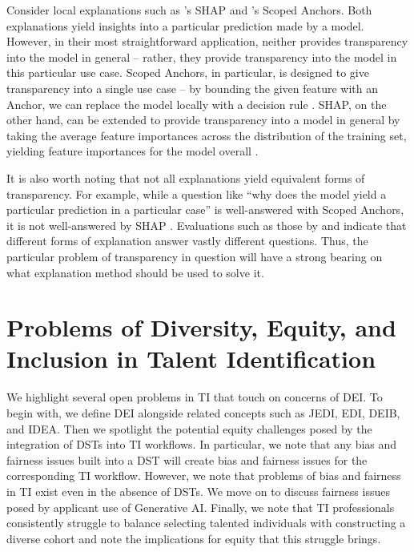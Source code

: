 Consider local explanations such as \textcite{lundberg_unified_2017}'s SHAP and \textcite{ribeiro_anchors_2018}'s Scoped Anchors. Both explanations yield insights into a particular prediction made by a model. However, in their most straightforward application, neither provides transparency into the model in general – rather, they provide transparency into the model in this particular use case. Scoped Anchors, in particular, is designed to give transparency into a single use case – by bounding the given feature with an Anchor, we can replace the model locally with a decision rule \cite{ribeiro_anchors_2018}. SHAP, on the other hand, can be extended to provide transparency into a model in general by taking the average feature importances across the distribution of the training set, yielding feature importances for the model overall \cite{lundberg_unified_2017}.

It is also worth noting that not all explanations yield equivalent forms of transparency. For example, while a question like “why does the model yield a particular prediction in a particular case” is well-answered with Scoped Anchors, it is not well-answered by SHAP \cite{lundberg_unified_2017,ribeiro_anchors_2018}. Evaluations such as those by \textcite{binns_human_2022} and \textcite{rader_explanations_2018} indicate that different forms of explanation answer vastly different questions. Thus, the particular problem of transparency in question will have a strong bearing on what explanation method should be used to solve it.


\section{Problems of Diversity, Equity, and Inclusion in Talent Identification}
We highlight several open problems in TI that touch on concerns of DEI. To begin with, we define DEI alongside related concepts such as JEDI, EDI, DEIB, and IDEA. Then we spotlight the potential equity challenges posed by the integration of DSTs into TI workflows. In particular, we note that any bias and fairness issues built into a DST will create bias and fairness issues for the corresponding TI workflow. However, we note that problems of bias and fairness in TI exist even in the absence of DSTs. We move on to discuss fairness issues posed by applicant use of Generative AI. Finally, we note that TI professionals consistently struggle to balance selecting talented individuals with constructing a diverse cohort and note the implications for equity that this struggle brings.  

